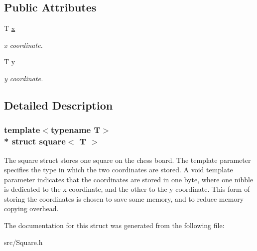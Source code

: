 \subsection*{Public Attributes}
\begin{DoxyCompactItemize}
\item 
T \hyperlink{structsquare_a9a6e49424fdfad5fe4ce893bb57ba467}{x}\hypertarget{structsquare_a9a6e49424fdfad5fe4ce893bb57ba467}{}\label{structsquare_a9a6e49424fdfad5fe4ce893bb57ba467}

\begin{DoxyCompactList}\small\item\em x coordinate. \end{DoxyCompactList}\item 
T \hyperlink{structsquare_a7b976f9389a2fc271a332b5014dfd1e9}{y}\hypertarget{structsquare_a7b976f9389a2fc271a332b5014dfd1e9}{}\label{structsquare_a7b976f9389a2fc271a332b5014dfd1e9}

\begin{DoxyCompactList}\small\item\em y coordinate. \end{DoxyCompactList}\end{DoxyCompactItemize}


\subsection{Detailed Description}
\subsubsection*{template$<$typename T$>$\\*
struct square$<$ T $>$}

The square struct stores one square on the chess board. The template parameter specifies the type in which the two coordinates are stored. A void template parameter indicates that the coordinates are stored in one byte, where one nibble is dedicated to the x coordinate, and the other to the y coordinate. This form of storing the coordinates is chosen to save some memory, and to reduce memory copying overhead. 

The documentation for this struct was generated from the following file\+:\begin{DoxyCompactItemize}
\item 
src/Square.\+h\end{DoxyCompactItemize}
